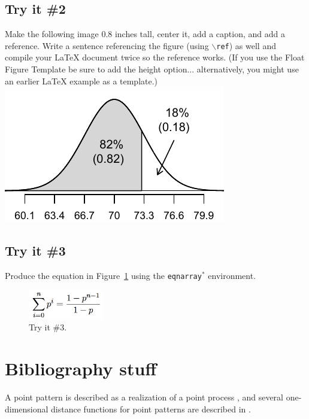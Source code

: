 \documentclass[11pt]{article} %
\begin{document}
\subsection{Try it \#2}

Make the following image 0.8 inches tall, center it, add a caption, and add a reference. Write a sentence referencing the figure (using \texttt{$\backslash$ref}) as well and compile your LaTeX document twice so the reference works. (If you use the Float Figure Template be sure to add the height option... alternatively, you might use an earlier LaTeX example as a template.) \\
\includegraphics{figures/lower82/lower82}

\subsection{Try it \#3}

Produce the equation in Figure~\ref{tryIt3} using the \texttt{eqnarray$^*$} environment.
\begin{figure}[htbp]
   \centering
   \includegraphics[height=0.5in]{tryIt/tryIt3}
   \caption{Try it \#3.}
   \label{tryIt3}
\end{figure}


\section{Bibliography stuff}

A point pattern is described as a realization of a point process \citep{daley}, and several one-dimensional distance functions for point patterns are described in \citet{victor}.



\end{document}

